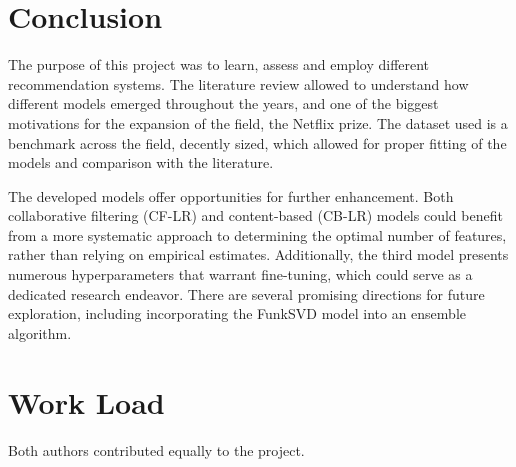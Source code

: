 \documentclass[conference]{IEEEtran}
\begin{document}

\section{Conclusion}

The purpose of this project was to learn, assess and employ different recommendation systems. The literature review allowed to understand how different models emerged throughout the years, and one of the biggest motivations for the expansion of the field, the Netflix prize. The dataset used is a benchmark across the field, decently sized, which allowed for proper fitting of the models and comparison with the literature.

The developed models offer opportunities for further enhancement. Both collaborative filtering (CF-LR) and content-based (CB-LR) models could benefit from a more systematic approach to determining the optimal number of features, rather than relying on empirical estimates. Additionally, the third model presents numerous hyperparameters that warrant fine-tuning, which could serve as a dedicated research endeavor. There are several promising directions for future exploration, including incorporating the FunkSVD model into an ensemble algorithm.

\section*{Work Load}

Both authors contributed equally to the project.



\end{document}
